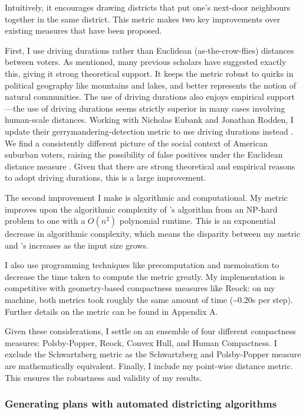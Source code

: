\documentclass[]{article}
\begin{document}
Intuitively, it encourages drawing districts that put one's next-door
neighbours together in the same district. This metric makes two key
improvements over existing measures that have been proposed.

First, I use driving durations rather than Euclidean (as-the-crow-flies)
distances between voters. As mentioned, many previous scholars have
suggested exactly this, giving it strong theoretical support. It keeps
the metric robust to quirks in political geography like mountains and
lakes, and better represents the notion of natural communities. The use
of driving durations also enjoys empirical support---the use of driving
durations seems strictly superior in many cases involving human-scale
distances. Working with Nicholas Eubank and Jonathan Rodden, I update
their gerrymandering-detection metric to use driving durations instead
\citep{er2019}. We find a consistently different picture of the social
context of American suburban voters, raising the possibility of false
positives under the Euclidean distance measure \citep*{elrwp}. Given
that there are strong theoretical and empirical reasons to adopt driving
durations, this is a large improvement.

The second improvement I make is algorithmic and computational. My
metric improves upon the algorithmic complexity of \citeauthor{fh2011}'s
algorithm from an NP-hard problem to one with a \(O(n^2)\) polynomial
runtime. This is an exponential decrease in algorithmic complexity,
which means the disparity between my metric and \citeauthor{fh2011}'s
increases as the input size grows.

I also use programming techniques like precomputation and memoisation to
decrease the time taken to compute the metric greatly. My implementation
is competitive with geometry-based compactness measures like Reock: on
my machine, both metrics took roughly the same amount of time
(\textasciitilde{}0.20s per step). Further details on the metric can be
found in Appendix A.

Given these considerations, I settle on an ensemble of four different
compactness measures: Polsby-Popper, Reock, Convex Hull, and Human
Compactness. I exclude the Schwartzberg metric as the Schwartzberg and
Polsby-Popper measure are mathematically equivalent. Finally, I include
my point-wise distance metric. This ensures the robustness and validity
of my results.

\hypertarget{generating-plans-with-automated-districting-algorithms}{%
\subsubsection{Generating plans with automated districting
algorithms}\label{generating-plans-with-automated-districting-algorithms}}
\end{document}
